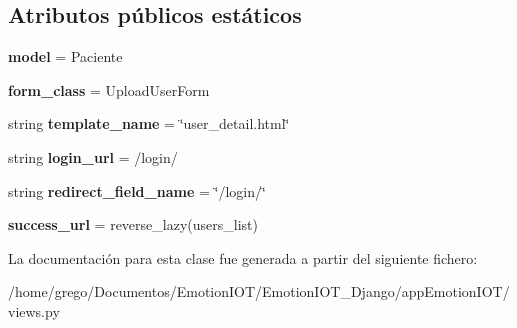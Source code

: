 \subsection*{Atributos públicos estáticos}
\begin{DoxyCompactItemize}
\item 
{\bfseries model} = Paciente\hypertarget{classappEmotionIOT_1_1views_1_1Create__user_a3ffc4e7d737cd43d7f8f33f58e01c73b}{}\label{classappEmotionIOT_1_1views_1_1Create__user_a3ffc4e7d737cd43d7f8f33f58e01c73b}

\item 
{\bfseries form\+\_\+class} = Upload\+User\+Form\hypertarget{classappEmotionIOT_1_1views_1_1Create__user_a996edb265dbd84bf9867bd8b21aef1fd}{}\label{classappEmotionIOT_1_1views_1_1Create__user_a996edb265dbd84bf9867bd8b21aef1fd}

\item 
string {\bfseries template\+\_\+name} = \char`\"{}user\+\_\+detail.\+html\char`\"{}\hypertarget{classappEmotionIOT_1_1views_1_1Create__user_a3b8fc58ef074b1cc1ded16f701d5daa6}{}\label{classappEmotionIOT_1_1views_1_1Create__user_a3b8fc58ef074b1cc1ded16f701d5daa6}

\item 
string {\bfseries login\+\_\+url} = \textquotesingle{}/login/\textquotesingle{}\hypertarget{classappEmotionIOT_1_1views_1_1Create__user_ab6f5da6a39b9aa89f265212d65664aa7}{}\label{classappEmotionIOT_1_1views_1_1Create__user_ab6f5da6a39b9aa89f265212d65664aa7}

\item 
string {\bfseries redirect\+\_\+field\+\_\+name} = \char`\"{}/login/\char`\"{}\hypertarget{classappEmotionIOT_1_1views_1_1Create__user_a829144a0d7e219ae18b94f152a5e2ac2}{}\label{classappEmotionIOT_1_1views_1_1Create__user_a829144a0d7e219ae18b94f152a5e2ac2}

\item 
{\bfseries success\+\_\+url} = reverse\+\_\+lazy(\textquotesingle{}users\+\_\+list\textquotesingle{})\hypertarget{classappEmotionIOT_1_1views_1_1Create__user_af8cd198ed7e106e6981e3bfd2f84902a}{}\label{classappEmotionIOT_1_1views_1_1Create__user_af8cd198ed7e106e6981e3bfd2f84902a}

\end{DoxyCompactItemize}


La documentación para esta clase fue generada a partir del siguiente fichero\+:\begin{DoxyCompactItemize}
\item 
/home/grego/\+Documentos/\+Emotion\+I\+O\+T/\+Emotion\+I\+O\+T\+\_\+\+Django/app\+Emotion\+I\+O\+T/views.\+py\end{DoxyCompactItemize}
